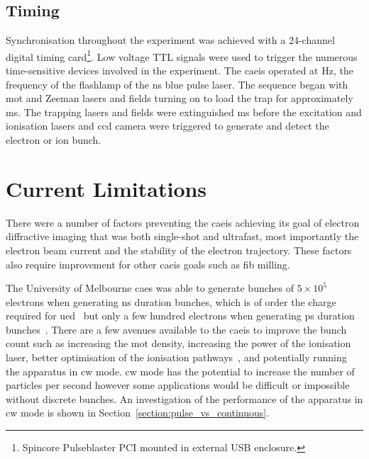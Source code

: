\subsection{Timing}\label{section:pulse_blaster}

Synchronisation throughout the experiment was achieved with a 24-channel digital timing card\footnote{Spincore Pulseblaster PCI mounted in external USB enclosure.}.
Low voltage TTL signals were used to trigger the numerous time-sensitive devices involved in the experiment.
The \gls{caeis} operated at \unit[10]{Hz}, the frequency of the flashlamp of the \unit[5]{ns} blue pulse laser.
The sequence began with \gls{mot} and Zeeman lasers and fields turning on to load the trap for approximately \unit[90]{ms}.
The trapping lasers and fields were extinguished \unit[5]{ms} before the excitation and ionisation lasers and \gls{ccd} camera were triggered to generate and detect the electron or ion bunch.

\section{Current Limitations}

There were a number of factors preventing the \gls{caeis} achieving its goal of electron diffractive imaging that was both single-shot and ultrafast, most importantly the electron beam current and the stability of the electron trajectory.
These factors also require improvement for other \gls{caeis} goals such as \gls{fib} milling.

The University of Melbourne \gls{caes} was able to generate bunches of $5\times10^5$ electrons when generating \unit[5]{ns} duration bunches, which is of order the charge required for \gls{ued}~\cite{van_oudheusden_compression_2010} but only a few hundred electrons when generating \unit[10]{ps} duration bunches~\cite{speirs_identification_2017}.
There are a few avenues available to the \gls{caeis} to improve the bunch count such as increasing the \gls{mot} density, increasing the power of the ionisation laser, better optimisation of the ionisation pathways~\cite{mcculloch_field_2017}, and potentially running the apparatus in \gls{cw} mode.
\Gls{cw} mode has the potential to increase the number of particles per second however some applications would be difficult or impossible without discrete bunches.
An investigation of the performance of the apparatus in \gls{cw} mode is shown in Section~\ref{section:pulse_vs_continuous}.

